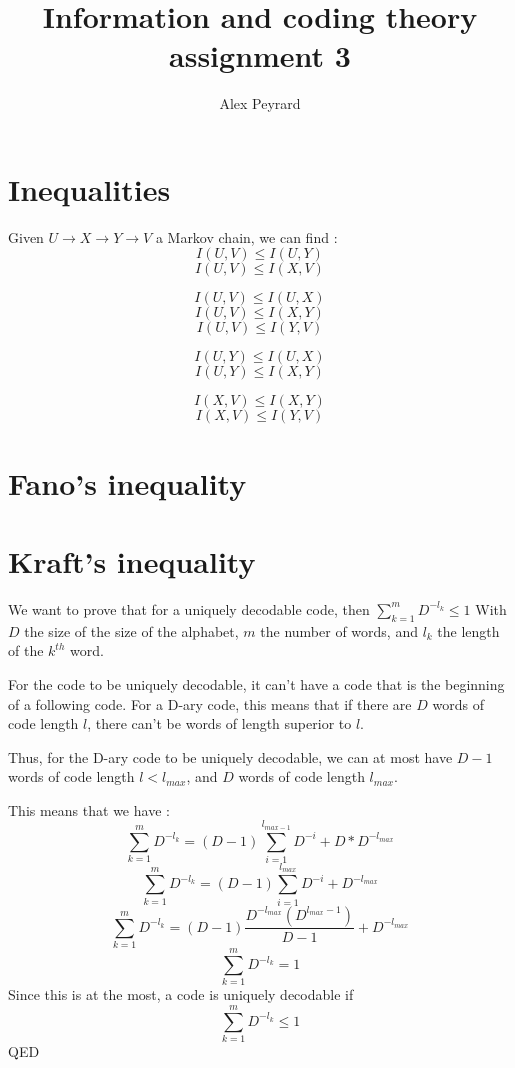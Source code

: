\documentclass[10pt]{article}
\author{Alex Peyrard}
\title{Information and coding theory assignment 3}
\begin{document}
\maketitle

\section{Inequalities}
Given $U\rightarrow X\rightarrow Y\rightarrow V$ a Markov chain, we can find :
\[I(U,V)\leq I(U,Y)\]
\[I(U,V)\leq I(X,V)\]

\[I(U,V)\leq I(U,X)\]
\[I(U,V)\leq I(X,Y)\]
\[I(U,V)\leq I(Y,V)\]

\[I(U,Y)\leq I(U,X)\]
\[I(U,Y)\leq I(X,Y)\]

\[I(X,V)\leq I(X,Y)\]
\[I(X,V)\leq I(Y,V)\]

\section{Fano's inequality}

\section{Kraft's inequality}
We want to prove that for a uniquely decodable code, then $\sum\limits_{k=1}^{m}D^{-l_{k}}\leq 1$
With $D$ the size of the size of the alphabet, $m$ the number of words, and $l_{k}$ the length of the $k^{th}$ word.

For the code to be uniquely decodable, it can't have a code that is the beginning of a following code. For a D-ary code, this means that if there are $D$ words of code length $l$, there can't be words of length superior to $l$.

Thus, for the D-ary code to be uniquely decodable, we can at most have $D-1$ words of code length $l < l_{max}$, and $D$ words of code length $l_{max}$.

This means that we have :
\[\sum\limits_{k=1}^{m}D^{-l_{k}}=(D-1)\sum\limits_{i=1}^{l_{max-1}}D^{-i}+D*D^{-l_{max}}\]
\[\sum\limits_{k=1}^{m}D^{-l_{k}}=(D-1)\sum\limits_{i=1}^{l_{max}}D^{-i}+D^{-l_{max}}\]
\[\sum\limits_{k=1}^{m}D^{-l_{k}}=(D-1)\frac{D^{-l_{max}}(D^{l_{max}-1})}{D-1}+D^{-l_{max}}\]
\[\sum\limits_{k=1}^{m}D^{-l_{k}}=1\]
Since this is at the most, a code is uniquely decodable if
\[\sum\limits_{k=1}^{m}D^{-l_{k}}\leq1\]
QED
\end{document}
